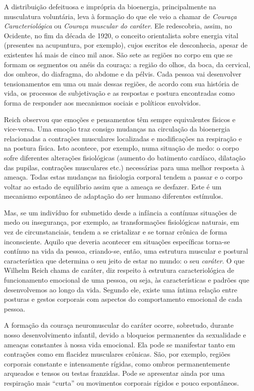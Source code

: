 A distribuição defeituosa e imprópria da bioenergia, principalmente na
musculatura voluntária, leva à formação do que ele veio a chamar de
\emph{Couraça Caracteriológica} ou \emph{Couraça muscular do caráter}.
Ele redescobria, assim, no Ocidente, no fim da década de 1920, o
conceito orientalista sobre energia vital (presentes na acupuntura, por
exemplo), cujos escritos ele desconhecia, apesar de existentes há mais
de cinco mil anos. São sete as regiões no corpo em que se formam os
segmentos ou anéis da couraça: a região do olhos, da boca, da cervical,
dos ombros, do diafragma, do abdome e da pélvis. Cada pessoa vai
desenvolver tensionamentos em uma ou mais dessas regiões, de acordo com
sua história de vida, os processos de subjetivação e as respostas e
postura encontradas como forma de responder aos mecanismos sociais e
políticos envolvidos.

Reich observou que emoções e pensamentos têm sempre equivalentes físicos
e vice-versa. Uma emoção traz consigo mudanças na circulação da
bioenergia relacionadas a contrações musculares localizadas e
modificações na respiração e na postura física. Isto acontece, por
exemplo, numa situação de medo: o corpo sofre diferentes alterações
fisiológicas (aumento do batimento cardíaco, dilatação das pupilas,
contrações musculares etc.) necessárias para uma melhor resposta à
ameaça. Todas estas mudanças na fisiologia corporal tendem a passar e o
corpo voltar ao estado de equilíbrio assim que a ameaça se desfazer.
Este é um mecanismo espontâneo de adaptação do ser humano diferentes
estímulos.

Mas, se um indivíduo for submetido desde a infância a contínuas
situações de medo ou insegurança, por exemplo, as transformações
fisiológicas naturais, em vez de circunstanciais, tendem a se
cristalizar e se tornar crônica de forma inconsciente. Aquilo que
deveria acontecer em situações específicas torna-se contínuo na vida da
pessoa, criando-se, então, uma estrutura muscular e postural
característica que determina o seu jeito de estar no mundo: o seu
\emph{caráter}. O que Wilhelm Reich chama de caráter, diz respeito à
estrutura caracteriológica de funcionamento emocional de uma pessoa, ou
seja, às características e padrões que desenvolvemos ao longo da vida.
Segundo ele, existe uma íntima relação entre posturas e gestos corporais
com aspectos do comportamento emocional de cada pessoa.

A formação da couraça neuromuscular do caráter ocorre, sobretudo,
durante nosso desenvolvimento infantil, devido a bloqueios permanentes
da sexualidade e ameaças constantes à nossa vida emocional. Ela pode se
manifestar tanto em contrações como em flacidez musculares crônicas.
São, por exemplo, regiões corporais constante e intensamente rígidas,
como ombros permanentemente arqueados e tensos ou testas franzidas. Pode
se apresentar ainda por uma respiração mais ``curta'' ou movimentos
corporais rígidos e pouco espontâneos.

